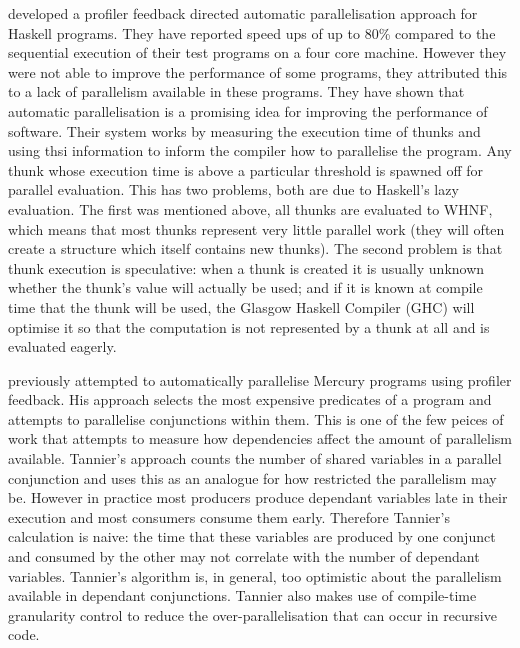 \citet{harris_07_feedback_imp_par} developed a profiler
feedback directed automatic parallelisation approach for Haskell programs.
They have reported speed ups of up to 80\% compared to the sequential
execution of their test programs on a four core machine.
However they were not able to improve the performance of some
programs, they attributed this to a lack of parallelism
available in these programs.
They have shown that automatic parallelisation is a promising idea for
improving the performance of software.
Their system works by measuring the execution time of thunks and using
thsi information to inform the compiler how to parallelise the program.
Any thunk whose execution time is above a particular threshold is
spawned off for parallel evaluation.
This has two problems, both are due to Haskell's lazy evaluation.
The first was mentioned above, all thunks are evaluated to WHNF,
which means that most thunks represent very little parallel work
(they will often create a structure which itself contains new thunks).
The second problem is that thunk execution is speculative:
when a thunk is created it is usually unknown whether the thunk's value
will actually be used;
and if it is known at compile time that the thunk will be used,
the Glasgow Haskell Compiler (GHC) will optimise it so that the computation
is not represented by a thunk at all and is evaluated eagerly.

\citet{tannier:2007:parallel_mercury} previously attempted to automatically
parallelise Mercury programs using profiler feedback.
His approach selects the most expensive predicates
of a program and attempts to parallelise conjunctions within them.
This is one of the few peices of work that attempts to measure how
dependencies affect the amount of parallelism available.
Tannier's approach counts the number of shared variables in a parallel
conjunction and uses this as an analogue for how restricted the
parallelism may be.
However in practice most producers produce dependant variables late in
their execution and most consumers consume them early.
Therefore Tannier's calculation is naive:
the time that these variables are produced by one conjunct and consumed
by the other may not correlate with the number of dependant variables.
Tannier's algorithm is, in general, too optimistic
about the parallelism available in dependant conjunctions.
Tannier also makes use of compile-time granularity control to reduce the
over-parallelisation that can occur in recursive code.

